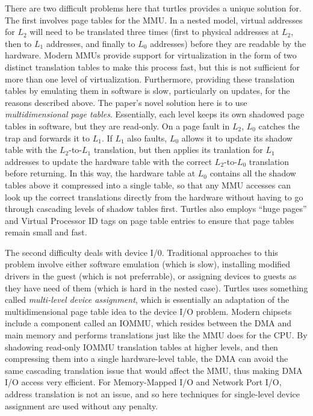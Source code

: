 \documentclass[10pt]{article}
\begin{document}
\begin{multicols*}{2}
There are two difficult problems here that turtles provides a unique solution for.
The first involves page tables for the MMU.  In a nested model, virtual addresses for $L_2$
will need to be translated three times (first to physical addresses at $L_2$, then to $L_1$
addresses, and finally to $L_0$ addresses)
before they are readable by the hardware.  Modern MMUs provide support for virtualization
in the form of two distinct translation tables to make this process fast, but this is not
sufficient for more than one level of virtualization.  Furthermore, providing these
translation tables by emulating them in software is slow, particularly on updates,
for the reasons described above.  The paper's novel solution here is to use
\emph{multidimensional page tables}.  Essentially, each level keeps its own
shadowed page tables in software, but they are read-only.  On a page fault in $L_2$,
$L_0$ catches the trap and forwards it to $L_1$.  If $L_1$ also faults, $L_0$ allows
it to update its shadow table with the $L_2$-to-$L_1$ translation, but then applies
its tranlation for $L_1$ addresses to update the hardware table with the correct
$L_2$-to-$L_0$ translation before returning.  In this way, the hardware table at $L_0$
contains all the shadow tables above it compressed into a single table, so that
any MMU accesses can look up the correct translations directly from the hardware
without having to go through cascading levels of shadow tables first.  Turtles
also employs ``huge pages'' and Virtual Processor ID tags on page table entries
to ensure that page tables remain small and fast.

The second difficulty deals with device I/0.  Traditional approaches to this problem
involve either software emulation (which is slow), installing modified drivers in the
guest (which is not preferrable), or assigning devices to guests as they have need
of them (which is hard in the nested case).  Turtles uses something called
\emph{multi-level device assignment}, which is essentially an adaptation of the
multidimensional page table idea to the device I/O problem.  Modern chipsets
include a component called an IOMMU, which resides between the DMA and main memory
and performs translations just like the MMU does for the CPU.  By shadowing read-only
IOMMU translation tables at higher levels, and then compressing them into a single
hardware-level table, the DMA can avoid the same cascading translation issue that
would affect the MMU, thus making DMA I/O access very efficient.  For Memory-Mapped I/O
and Network Port I/O, address translation is not an issue, and so here techniques for
single-level device assignment are used without any penalty.


\end{multicols*}
\end{document}
